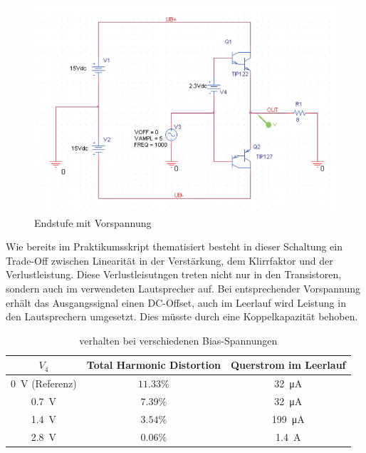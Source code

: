 \begin{figure}[H]
    \centering
    \includegraphics{tex/7_Leistungsverstaerker/pictures/Endstufe_Vorspannung_Schaltung.png}
    \caption{Endstufe mit Vorspannung}
    \label{fig:my_label}
\end{figure}

Wie bereits im Praktikumsskript thematisiert besteht in dieser Schaltung ein Trade-Off zwischen Linearität in der Verstärkung, dem Klirrfaktor und der Verlustleistung. Diese Verlustleisutngen treten nicht nur in den Transistoren, sondern auch im verwendeten Lautsprecher auf. Bei entsprechender Vorspannung erhält das Ausgangssignal einen DC-Offset, auch im Leerlauf wird Leistung in den Lautsprechern umgesetzt. Dies müsste durch eine Koppelkapazität behoben. 

\begin{table}[H]
    \centering
    \begin{tabular}{|c||c|c|}\hline
         $V_4$ & Total Harmonic Distortion & Querstrom im Leerlauf  \\ \hline \hline
         \SI{0}{\volt} (Referenz)& $11.33\%$ & \SI{32}{\micro \ampere} \\ \hline
         \SI{0.7}{\volt}& $7.39\%$ & \SI{32}{\micro \ampere} \\ \hline
         \SI{1.4}{\volt}& $3.54\%$ & \SI{199}{\micro \ampere} \\ \hline
         \SI{2.8}{\volt}& $0.06\%$ & \SI{1.4}{\ampere} \\ \hline
    \end{tabular} 
    \caption{verhalten bei verschiedenen Bias-Spannungen}
    \label{tab:my_label}
\end{table}

